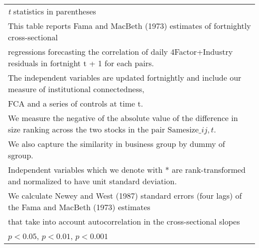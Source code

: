 {\begin{tabular}{l*{7}{c}}
\hline\hline
\multicolumn{8}{l}{\footnotesize \textit{t} statistics in parentheses}\\
\multicolumn{8}{l}{\footnotesize This table reports Fama and MacBeth (1973) estimates of fortnightly cross-sectional}\\
\multicolumn{8}{l}{\footnotesize  regressions forecasting the correlation of daily 4Factor+Industry residuals in fortnight t + 1 for each pairs.}\\
\multicolumn{8}{l}{\footnotesize The independent variables are updated fortnightly and include our measure of institutional connectedness,}\\
\multicolumn{8}{l}{\footnotesize  FCA and a series of controls at time t.}\\
\multicolumn{8}{l}{\footnotesize We measure the negative of the absolute value of the difference in size ranking across the two stocks in the pair $ \text{Samesize}\_{ij,t} $.}\\
\multicolumn{8}{l}{\footnotesize We also capture the similarity in business group by dummy of sgroup.}\\
\multicolumn{8}{l}{\footnotesize Independent variables which  we denote with * are rank-transformed and normalized to have unit standard deviation.}\\
\multicolumn{8}{l}{\footnotesize  We calculate Newey and West (1987) standard errors (four lags) of the Fama and MacBeth (1973) estimates }\\
\multicolumn{8}{l}{\footnotesize  that take into account autocorrelation in the cross-sectional slopes}\\
\multicolumn{8}{l}{\footnotesize \sym{*} \(p<0.05\), \sym{**} \(p<0.01\), \sym{***} \(p<0.001\)}\\
\end{tabular}
}
